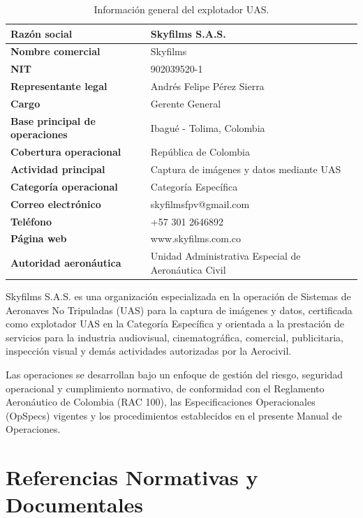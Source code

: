 \begin{table}[H]
\centering
\renewcommand{\arraystretch}{1.35}
\begin{tabularx}{\textwidth}{|>{\bfseries}p{5cm}|X|}
\hline
Razón social & Skyfilms S.A.S. \\ \hline
Nombre comercial & Skyfilms \\ \hline
NIT & 902039520-1 \\ \hline
Representante legal & Andrés Felipe Pérez Sierra \\ \hline
Cargo & Gerente General \\ \hline
Base principal de operaciones & Ibagué - Tolima, Colombia \\ \hline
Cobertura operacional & República de Colombia \\ \hline
Actividad principal & Captura de imágenes y datos mediante UAS \\ \hline
Categoría operacional & Categoría Específica \\ \hline
Correo electrónico & skyfilmsfpv@gmail.com \\ \hline
Teléfono & +57 301 2646892 \\ \hline
Página web & www.skyfilms.com.co \\ \hline
Autoridad aeronáutica & Unidad Administrativa Especial de Aeronáutica Civil \\ \hline
\end{tabularx}
\caption{Información general del explotador UAS.}
\end{table}





Skyfilms S.A.S. es una organización especializada en la operación de Sistemas de Aeronaves No Tripuladas (UAS) para la captura de imágenes y datos, certificada como explotador UAS en la Categoría Específica y orientada a la prestación de servicios para la industria audiovisual, cinematográfica, comercial, publicitaria, inspección visual y demás actividades autorizadas por la Aerocivil.

Las operaciones se desarrollan bajo un enfoque de gestión del riesgo, seguridad operacional y cumplimiento normativo, de conformidad con el Reglamento Aeronáutico de Colombia (RAC 100), las Especificaciones Operacionales (OpSpecs) vigentes y los procedimientos establecidos en el presente Manual de Operaciones.







\section{Referencias Normativas y Documentales}


